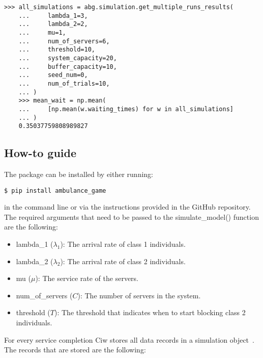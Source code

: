 \begin{lstlisting}[style=pystyle]
    >>> all_simulations = abg.simulation.get_multiple_runs_results(
    ...     lambda_1=3,
    ...     lambda_2=2,
    ...     mu=1,
    ...     num_of_servers=6,
    ...     threshold=10,
    ...     system_capacity=20,
    ...     buffer_capacity=10,
    ...     seed_num=0,
    ...     num_of_trials=10,
    ... )
    >>> mean_wait = np.mean(
    ...     [np.mean(w.waiting_times) for w in all_simulations]
    ... )
    0.35037759808989827
\end{lstlisting}


\subsection{How-to guide}

The package can be installed by either running:

\begin{lstlisting}[style=terminalstyle]
    $ pip install ambulance_game
\end{lstlisting}

in the command line or via the instructions provided in the GitHub repository.
The required arguments that need to be passed to the simulate\_model() function
are the following:
\begin{itemize}
    \item lambda\_1 (\(\lambda_1\)): The arrival rate of class 1 individuals.
    \item lambda\_2 (\(\lambda_2\)): The arrival rate of class 2 individuals.
    \item mu (\(\mu\)): The service rate of the servers.
    \item num\_of\_servers (\(C\)): The number of servers in the system.
    \item threshold (\(T\)): The threshold that indicates when to start blocking 
    class 2 individuals.
\end{itemize}


For every service completion Ciw stores all data records in a simulation 
object~\cite{ciwpython}.
The records that are stored are the following:

